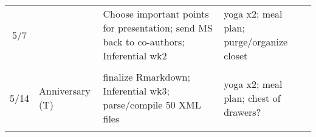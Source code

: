 \documentclass[]{article}
\begin{document}
\begin{longtable}[]{@{}clll@{}}
\begin{minipage}[t]{0.04\columnwidth}\centering\strut
5/7\strut
\end{minipage} & \begin{minipage}[t]{0.24\columnwidth}\raggedright\strut
\strut
\end{minipage} & \begin{minipage}[t]{0.33\columnwidth}\raggedright\strut
Choose important points for presentation; send MS back to co-authors;
Inferential wk2\strut
\end{minipage} & \begin{minipage}[t]{0.28\columnwidth}\raggedright\strut
yoga x2; meal plan; purge/organize closet\strut
\end{minipage}\tabularnewline
\begin{minipage}[t]{0.04\columnwidth}\centering\strut
\strut
\end{minipage} & \begin{minipage}[t]{0.24\columnwidth}\raggedright\strut
\strut
\end{minipage} & \begin{minipage}[t]{0.33\columnwidth}\raggedright\strut
\strut
\end{minipage} & \begin{minipage}[t]{0.28\columnwidth}\raggedright\strut
\strut
\end{minipage}\tabularnewline
\begin{minipage}[t]{0.04\columnwidth}\centering\strut
5/14\strut
\end{minipage} & \begin{minipage}[t]{0.24\columnwidth}\raggedright\strut
Anniversary (T)\strut
\end{minipage} & \begin{minipage}[t]{0.33\columnwidth}\raggedright\strut
finalize Rmarkdown; Inferential wk3; parse/compile 50 XML files\strut
\end{minipage} & \begin{minipage}[t]{0.28\columnwidth}\raggedright\strut
yoga x2; meal plan; chest of drawers?\strut
\end{minipage}\tabularnewline
\begin{minipage}[t]{0.04\columnwidth}\centering\strut
\strut
\end{minipage} & \begin{minipage}[t]{0.24\columnwidth}\raggedright\strut
\strut
\end{minipage} & \begin{minipage}[t]{0.33\columnwidth}\raggedright\strut

\end{minipage}
\end{longtable}
\end{document}
